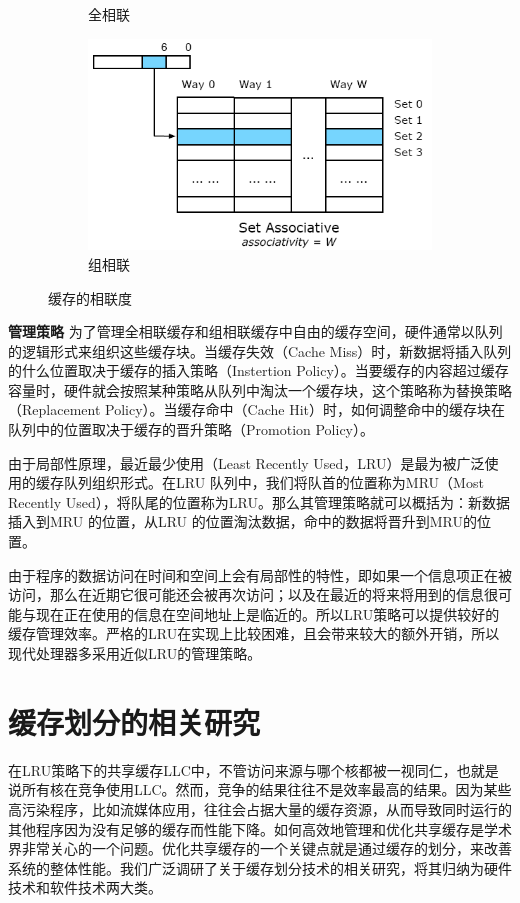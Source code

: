 \begin{figure}[htbp]
\begin{subfigure}[b]{0.24\linewidth}
        \caption{全相联}
    \end{subfigure}%
    \begin{subfigure}[b]{0.52\linewidth}
        \centering\includegraphics[width=0.9\linewidth]{figures/CacheAsso3.png}
        \caption{组相联}
    \end{subfigure}
    \caption{缓存的相联度}
    \label{fig:cache_asso}
\end{figure}

\textbf{管理策略}
为了管理全相联缓存和组相联缓存中自由的缓存空间，硬件通常以队列的逻辑形式来组织这些缓存块。当缓存失效（Cache Miss）时，新数据将插入队列的什么位置取决于缓存的插入策略（Instertion Policy）。当要缓存的内容超过缓存容量时，硬件就会按照某种策略从队列中淘汰一个缓存块，这个策略称为替换策略（Replacement Policy）。当缓存命中（Cache Hit）时，如何调整命中的缓存块在队列中的位置取决于缓存的晋升策略（Promotion Policy）。

由于局部性原理，最近最少使用（Least Recently Used，LRU）是最为被广泛使用的缓存队列组织形式。在LRU 队列中，我们将队首的位置称为MRU（Most Recently Used），将队尾的位置称为LRU。那么其管理策略就可以概括为：新数据插入到MRU 的位置，从LRU 的位置淘汰数据，命中的数据将晋升到MRU的位置。

由于程序的数据访问在时间和空间上会有局部性的特性，即如果一个信息项正在被访问，那么在近期它很可能还会被再次访问；以及在最近的将来将用到的信息很可能与现在正在使用的信息在空间地址上是临近的。所以LRU策略可以提供较好的缓存管理效率。严格的LRU在实现上比较困难，且会带来较大的额外开销，所以现代处理器多采用近似LRU的管理策略。

\section{缓存划分的相关研究}
在LRU策略下的共享缓存LLC中，不管访问来源与哪个核都被一视同仁，也就是说所有核在竞争使用LLC。然而，竞争的结果往往不是效率最高的结果。因为某些高污染程序，比如流媒体应用，往往会占据大量的缓存资源，从而导致同时运行的其他程序因为没有足够的缓存而性能下降。如何高效地管理和优化共享缓存是学术界非常关心的一个问题。优化共享缓存的一个关键点就是通过缓存的划分，来改善系统的整体性能。我们广泛调研了关于缓存划分技术的相关研究，将其归纳为硬件技术和软件技术两大类。


